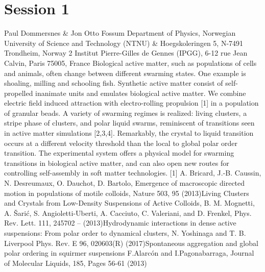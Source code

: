 \documentclass{article}
\begin{document}
\section*{Session 1}
{Paul Dommersnes & Jon Otto Fossum}
{Department of Physics, Norwegian University of Science and Technology (NTNU) &
Hoegskoleringen 5, N-7491 Trondheim, Norway 2 Institut Pierre-Gilles de Gennes (IPGG),
6-12 rue Jean Calvin, Paris 75005, France}
{Biological active matter, such as populations of cells and animals, often change between
different swarming states. One example is shoaling, milling and schooling fish. Synthetic
active matter consist of self-propelled inanimate units and emulates biological active matter.
We combine electric field induced attraction with electro-rolling propulsion [1] in a
population of granular beads. A variety of swarming regimes is realized: living clusters, a stripe
phase of clusters, and polar liquid swarms, reminiscent of transitions seen in active matter
simulations [2,3,4]. Remarkably, the crystal to liquid transition occurs at a different velocity
threshold than the local to global polar order transition. The experimental system offers a
physical model for swarming transitions in biological active matter, and can also open new
routes for controlling self-assembly in soft matter technologies.\newline\newline
\small{
[1] A. Bricard, J.-B. Caussin, N. Desreumaux, O. Dauchot, D. Bartolo, Emergence of macroscopic
directed motion in populations of motile colloids, Nature 503, 95 (2013)\newline
[2] Living Clusters and Crystals from Low-Density Suspensions of Active Colloids, B. M. Mognetti, A.
Šarić, S. Angioletti-Uberti, A. Cacciuto, C. Valeriani, and D. Frenkel, Phys. Rev. Lett. 111, 245702 – (2013)\newline
[3] Hydrodynamic interactions in dense active suspensions: From polar order to dynamical clusters,
N. Yoshinaga and T. B. Liverpool Phys. Rev. E 96, 020603(R) (2017)\newline
[4] Spontaneous aggregation and global polar ordering in squirmer suspensions
F.Alarcón and I.Pagonabarraga, Journal of Molecular Liquids, 185, Pages 56-61 (2013)}}
\end{document}
